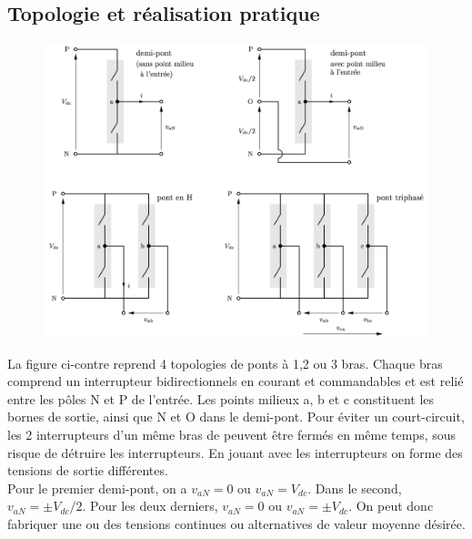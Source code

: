 	\subsection{Topologie et réalisation pratique}	
		\begin{figure}
		\vspace{-5mm}
		\includegraphics[scale=0.2]{ch4/7}
		\end{figure}
		La figure ci-contre reprend 4 topologies de ponts à 1,2 ou 3 bras. Chaque bras comprend un interrupteur bidirectionnels en courant et commandables et est relié entre les pôles N et P de l'entrée. Les points milieux a, b et c constituent les bornes de sortie, ainsi que N et O dans le demi-pont. Pour éviter un court-circuit, les 2 interrupteurs d'un même bras de peuvent être fermés en même temps, sous risque de détruire les interrupteurs. En jouant avec les interrupteurs on forme des tensions de sortie différentes. \\
		
		Pour le premier demi-pont, on a $v_{aN} = 0$ ou $v_{aN} = V_{dc}$. Dans le second, $v_{aN} = \pm V_{dc}/2$. Pour les deux derniers, $v_{aN} = 0$ ou $v_{aN} = \pm V_{dc}$. On peut donc fabriquer une ou des tensions continues ou alternatives de valeur moyenne désirée.  
		
